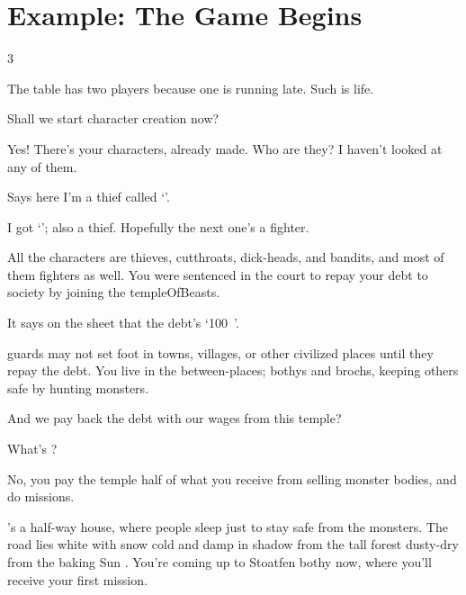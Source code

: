 \section*{Example: The Game Begins}

\begin{multicols}{3}

\noindent
The table has two players because one is running late.
Such is life.


\begin{description}\sf
  \item[Player 1:]
  Shall we start character creation now?
  \item[\Glsentrytext{gm}:]
  Yes!
  There's your characters, already made.
  Who are they?
  I haven't looked at any of them.
  \item[Player 1:]
  Says here I'm a thief called `\composeHumanName'.
  \item[Player 2:]
  I got `\composeHumanName'; also a thief.
  Hopefully the next one's a fighter.
  \item[\Glsentrytext{gm}:]
  All the characters are thieves, cutthroats, dick-heads, and bandits, and most of them fighters as well.
  You were sentenced in the \gls{court} to repay your debt to society by joining the \gls{templeOfBeasts}.
  \item[Player 1:]
  It says on the sheet that the debt's `100~'.
  \item[\Gls{gm}:]
  \Glspl{guard} may not set foot in towns, \glspl{village}, or other civilized places until they repay the debt.
  You live in the between-places; \glspl{bothy} and \glspl{broch}, keeping others safe by hunting \glspl{monster}.
  \item[Player 1:]
  And we pay back the debt with our wages from this \gls{temple}?
  \item[Player 2:]
  What's ?
  \item[\Gls{gm}:]
  No, you pay the \gls{temple} half of what you receive from selling monster bodies, and do missions.

  's a half-way house, where people sleep just to stay safe from the \glspl{monster}.
  The road lies
  \ifcase\thetemperature%
    white with snow%
  \or%
    cold and damp%
  \or%
    in shadow from the tall forest%
  \else%
    dusty-dry from the baking Sun%
  \fi.
  You're coming up to Stoatfen \Gls{bothy} now, where you'll receive your first mission.


\end{description}
\end{multicols}
